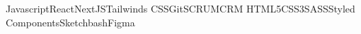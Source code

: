 

\begin{cvskills}
    \cvskill
    {\raisebox{\normalbaselineskip}{Technologies}}{
        Javascript{\enskip\cdotp\enskip}React{\enskip\cdotp\enskip}NextJS{\enskip\cdotp\enskip}Tailwinds CSS{\enskip\cdotp\enskip}Git{\enskip\cdotp\enskip}SCRUM{\enskip\cdotp\enskip}CRM \newline HTML5{\enskip\cdotp\enskip}CSS3{\enskip\cdotp\enskip}SASS{\enskip\cdotp\enskip}Styled Components{\enskip\cdotp\enskip}Sketch{\enskip\cdotp\enskip}bash{\enskip\cdotp\enskip}Figma
    }
    
\end{cvskills}
